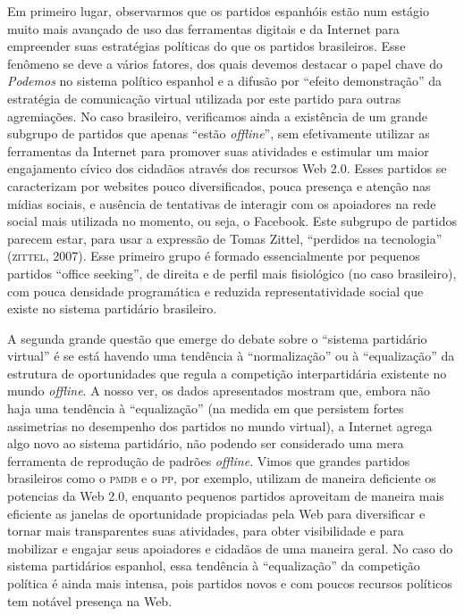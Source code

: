 Em primeiro lugar, observarmos que os partidos espanhóis estão num
estágio muito mais avançado de uso das ferramentas digitais e da
Internet para empreender suas estratégias políticas do que os partidos
brasileiros. Esse fenômeno se deve a vários fatores, dos quais devemos
destacar o papel chave do \emph{Podemos} no sistema político espanhol e
a difusão por ``efeito demonstração'' da estratégia de comunicação
virtual utilizada por este partido para outras agremiações. No caso
brasileiro, verificamos ainda a existência de um grande subgrupo de
partidos que apenas ``estão \emph{offline}'', sem efetivamente utilizar as
ferramentas da Internet para promover suas atividades e estimular um
maior engajamento cívico dos cidadãos através dos recursos Web 2.0.
Esses partidos se caracterizam por websites pouco diversificados, pouca
presença e atenção nas mídias sociais, e ausência de tentativas de
interagir com os apoiadores na rede social mais utilizada no momento, ou
seja, o Facebook. Este subgrupo de partidos parecem estar, para usar a
expressão de Tomas Zittel, ``perdidos na tecnologia'' (\textsc{zittel}, 2007).
Esse primeiro grupo é formado essencialmente por pequenos partidos
``office seeking'', de direita e de perfil mais fisiológico (no caso
brasileiro), com pouca densidade programática e reduzida
representatividade social que existe no sistema partidário brasileiro.

A segunda grande questão que emerge do debate sobre o ``sistema
partidário virtual'' é se está havendo uma tendência à ``normalização''
ou à ``equalização'' da estrutura de oportunidades que regula a
competição interpartidária existente no mundo \emph{offline}. A nosso ver, os
dados apresentados mostram que, embora não haja uma tendência à
``equalização'' (na medida em que persistem fortes assimetrias no
desempenho dos partidos no mundo virtual), a Internet agrega algo novo
ao sistema partidário, não podendo ser considerado uma mera ferramenta
de reprodução de padrões \emph{offline}. Vimos que grandes partidos
brasileiros como o \textsc{pmdb} e o \textsc{pp}, por exemplo, utilizam de maneira
deficiente os potencias da Web 2.0, enquanto pequenos partidos
aproveitam de maneira mais eficiente as janelas de oportunidade
propiciadas pela Web para diversificar e tornar mais transparentes suas
atividades, para obter visibilidade e para mobilizar e engajar seus
apoiadores e cidadãos de uma maneira geral. No caso do sistema
partidários espanhol, essa tendência à ``equalização'' da competição
política é ainda mais intensa, pois partidos novos e com poucos recursos
políticos tem notável presença na Web.

